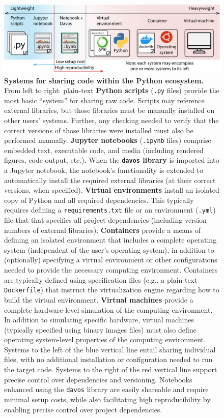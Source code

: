 \documentclass[preprint,12pt, a4paper]{elsarticle}
\begin{document}
\begin{figure}[tp]
\centering
\includegraphics[width=\textwidth]{figs/shareable_code}
\caption{\small \textbf{Systems for sharing code within the Python
    ecosystem.}  From left to right: plain-text \textbf{Python
    scripts} (\texttt{.py} files) provide the most basic ``system''
  for sharing raw code.  Scripts may reference external libraries, but
  those libraries must be manually installed on other users' systems.
  Further, any checking needed to verify that the correct versions of
  those libraries were installed must also be performed manually.
  \textbf{Jupyter notebooks} (\texttt{.ipynb} files) comprise embedded
  text, executable code, and media (including rendered figures, code
  output, etc.).  When the \textbf{\texttt{davos} library} is imported
  into a Jupyter notebook, the notebook's functionality is extended to
  automatically install the required external libraries (at their
  correct versions, when specified).  \textbf{Virtual environments}
  install an isolated copy of Python and all required dependencies.
  This typically requires defining a \texttt{requirements.txt} file or
  an environment (\texttt{.yml}) file that that specifies all project
  dependencies (including version numbers of external libraries).
  \textbf{Containers} provide a means of defining an isolated
  environment that includes a complete operating system (independent
  of the user's operating system), in addition to (optionally)
  specifying a virtual environment or other configurations needed to
  provide the necessary computing environment.  Containers are
  typically defined using specification files (e.g., a plain-text
  \texttt{Dockerfile}) that instruct the virtualization engine
  regarding how to build the virtual environment.  \textbf{Virtual
    machines} provide a complete hardware-level simulation of the
  computing environment.  In addition to simulating specific hardware,
  virtual machines (typically specified using binary images files)
  must also define operating system-level properties of the computing
  environment.  Systems to the left of the blue vertical line entail
  sharing individual files, with no additional installation or
  configuration needed to run the target code.  Systems to the right
  of the red vertical line support precise control over dependencies
  and versioning.  Notebooks enhanced using the \texttt{davos} library
  are easily shareable and require minimal setup costs, while also
  facilitating high reproducibility by enabling precise control over
  project dependencies.}
\label{fig:code-sharing}
\end{figure}
\end{document}
